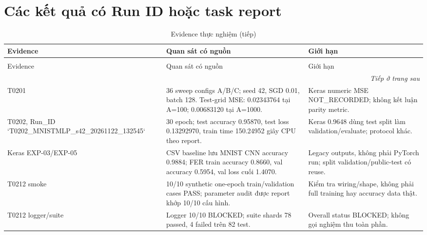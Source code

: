 \section{Các kết quả có Run ID hoặc task report}
\begin{longtable}{p{}p{}p{}}
\caption{Evidence thực nghiệm và giới hạn diễn giải}\label{tab:t0402-results}\\
\toprule Evidence & Quan sát có nguồn & Giới hạn \\
\midrule
\endfirsthead
\caption[]{Evidence thực nghiệm (tiếp)}\\\toprule Evidence & Quan sát có nguồn & Giới hạn \\
\midrule
\endhead
\midrule\multicolumn{3}{r}{\footnotesize\itshape Tiếp ở trang sau}\\
\endfoot
\bottomrule
\endlastfoot
T0201 & 36 sweep configs A/B/C; seed 42, SGD 0.01, batch 128. Test-grid MSE: 0.02343764 tại A=100; 0.00683120 tại A=1000. & Keras numeric MSE NOT\_RECORDED; không kết luận parity metric. \\
T0202, Run\_ID `T0202\_MNISTMLP\_s42\_20261122\_132545` & 30 epoch; test accuracy 0.95870, test loss 0.13292970, train time 150.24952 giây CPU theo report. & Keras 0.9648 dùng test split làm validation/evaluate; protocol khác. \\
Keras EXP-03/EXP-05 & CSV baseline lưu MNIST CNN accuracy 0.9884; FER train accuracy 0.8660, val accuracy 0.5954, val loss cuối 1.4070. & Legacy outputs, không phải PyTorch run; split validation/public-test có reuse. \\
T0212 smoke & 10/10 synthetic one-epoch train/validation cases PASS; parameter audit được report khớp 10/10 cấu hình. & Kiểm tra wiring/shape, không phải full training hay accuracy data thật. \\
T0212 logger/suite & Logger 10/10 BLOCKED; suite shards 78 passed, 4 failed trên 82 test. & Overall status BLOCKED; không gọi nghiệm thu toàn phần. \\
\end{longtable}

